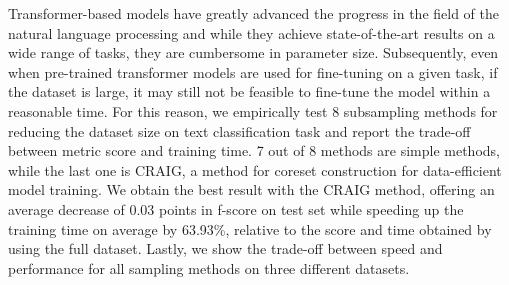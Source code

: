 Transformer-based models have greatly advanced the progress in the field of the natural language processing and while they achieve state-of-the-art results on a wide range of tasks, they are cumbersome in parameter size. Subsequently, even when pre-trained transformer models are used for fine-tuning on a given task, if the dataset is large, it may still not be feasible to fine-tune the model within a reasonable time. For this reason, we empirically test 8 subsampling methods for reducing the dataset size on text classification task and report the trade-off between metric score and training time. 7 out of 8 methods are simple methods, while the last one is CRAIG, a method for coreset construction for data-efficient model training. We obtain the best result with the CRAIG method, offering an average decrease of 0.03 points in f-score on test set while speeding up the training time on average by 63.93\%, relative to the score and time obtained by using the full dataset. Lastly, we show the trade-off between speed and performance for all sampling methods on three different datasets.

